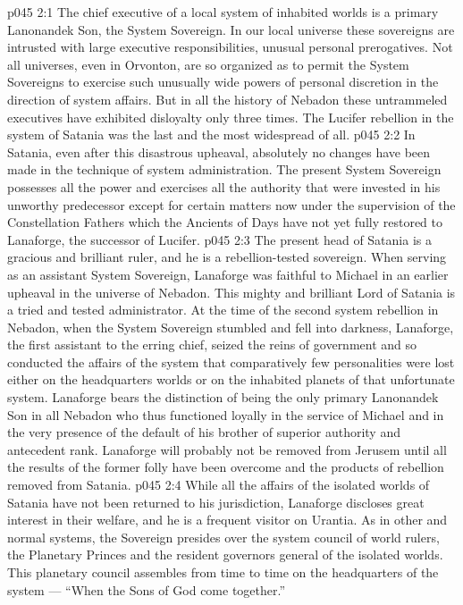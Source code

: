 \vs p045 2:1 The chief executive of a local system of inhabited worlds is a primary Lanonandek Son, the System Sovereign. In our local universe these sovereigns are intrusted with large executive responsibilities, unusual personal prerogatives. Not all universes, even in Orvonton, are so organized as to permit the System Sovereigns to exercise such unusually wide powers of personal discretion in the direction of system affairs. But in all the history of Nebadon these untrammeled executives have exhibited disloyalty only three times. The Lucifer rebellion in the system of Satania was the last and the most widespread of all.
\vs p045 2:2 In Satania, even after this disastrous upheaval, absolutely no changes have been made in the technique of system administration. The present System Sovereign possesses all the power and exercises all the authority that were invested in his unworthy predecessor except for certain matters now under the supervision of the Constellation Fathers which the Ancients of Days have not yet fully restored to Lanaforge, the successor of Lucifer.
\vs p045 2:3 \pc The present head of Satania is a gracious and brilliant ruler, and he is a rebellion\hyp{}tested sovereign. When serving as an assistant System Sovereign, Lanaforge was faithful to Michael in an earlier upheaval in the universe of Nebadon. This mighty and brilliant Lord of Satania is a tried and tested administrator. At the time of the second system rebellion in Nebadon, when the System Sovereign stumbled and fell into darkness, Lanaforge, the first assistant to the erring chief, seized the reins of government and so conducted the affairs of the system that comparatively few personalities were lost either on the headquarters worlds or on the inhabited planets of that unfortunate system. Lanaforge bears the distinction of being the only primary Lanonandek Son in all Nebadon who thus functioned loyally in the service of Michael and in the very presence of the default of his brother of superior authority and antecedent rank. Lanaforge will probably not be removed from Jerusem until all the results of the former folly have been overcome and the products of rebellion removed from Satania.
\vs p045 2:4 \pc While all the affairs of the isolated worlds of Satania have not been returned to his jurisdiction, Lanaforge discloses great interest in their welfare, and he is a frequent visitor on Urantia. As in other and normal systems, the Sovereign presides over the system council of world rulers, the Planetary Princes and the resident governors general of the isolated worlds. This planetary council assembles from time to time on the headquarters of the system --- “When the Sons of God come together.”
